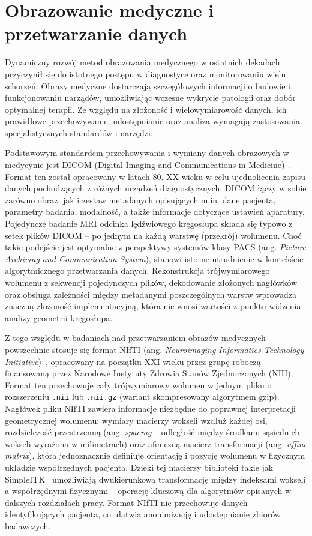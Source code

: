 \section{Obrazowanie medyczne i przetwarzanie danych}
\label{sec:obrazowanie}
Dynamiczny rozwój metod obrazowania medycznego w ostatnich dekadach przyczynił się do istotnego postępu w diagnostyce oraz monitorowaniu wielu schorzeń.
Obrazy medyczne dostarczają szczegółowych informacji o budowie i funkcjonowaniu narządów, umożliwiając wczesne wykrycie patologii oraz dobór optymalnej terapii.
Ze względu na złożoność i wielowymiarowość danych, ich prawidłowe przechowywanie, udostępnianie oraz analiza wymagają zastosowania specjalistycznych standardów i narzędzi.

Podstawowym standardem przechowywania i wymiany danych obrazowych w medycynie jest DICOM (Digital Imaging and Communications in Medicine)~\cite{dicom}.
Format ten został opracowany w latach 80. XX wieku w celu ujednolicenia zapisu danych pochodzących z różnych urządzeń diagnostycznych.
DICOM łączy w sobie zarówno obraz, jak i zestaw metadanych opisujących m.in. dane pacjenta, parametry badania, modalność, a także informacje dotyczące ustawień aparatury.
Pojedyncze badanie MRI odcinka lędźwiowego kręgosłupa składa się typowo z setek plików DICOM -- po jednym na każdą warstwę (przekrój) wolumenu.
Choć takie podejście jest optymalne z perspektywy systemów klasy PACS (ang. \textit{Picture Archiving and Communication System}), stanowi istotne utrudnienie w kontekście algorytmicznego przetwarzania danych.
Rekonstrukcja trójwymiarowego wolumenu z sekwencji pojedynczych plików, dekodowanie złożonych nagłówków oraz obsługa zależności między metadanymi poszczególnych warstw wprowadza znaczną złożoność implementacyjną, która nie wnosi wartości z punktu widzenia analizy geometrii kręgosłupa.

Z tego względu w badaniach nad przetwarzaniem obrazów medycznych powszechnie stosuje się format NIfTI (ang. \textit{Neuroimaging Informatics Technology Initiative})~\cite{nifti}, opracowany na początku XXI wieku przez grupę roboczą finansowaną przez Narodowe Instytuty Zdrowia Stanów Zjednoczonych (NIH).
Format ten przechowuje cały trójwymiarowy wolumen w jednym pliku o rozszerzeniu \texttt{.nii} lub \texttt{.nii.gz} (wariant skompresowany algorytmem gzip).
Nagłówek pliku NIfTI zawiera informacje niezbędne do poprawnej interpretacji geometrycznej wolumenu: wymiary macierzy wokseli wzdłuż każdej osi, rozdzielczość przestrzenną (ang. \textit{spacing} -- odległość między środkami sąsiednich wokseli wyrażona w milimetrach) oraz afiniczną macierz transformacji (ang. \textit{affine matrix}), która jednoznacznie definiuje orientację i pozycję wolumenu w fizycznym układzie współrzędnych pacjenta.
Dzięki tej macierzy biblioteki takie jak SimpleITK~\cite{sitk} umożliwiają dwukierunkową transformację między indeksami wokseli a współrzędnymi fizycznymi -- operację kluczową dla algorytmów opisanych w dalszych rozdziałach pracy.
Format NIfTI nie przechowuje danych identyfikujących pacjenta, co ułatwia anonimizację i udostępnianie zbiorów badawczych.

